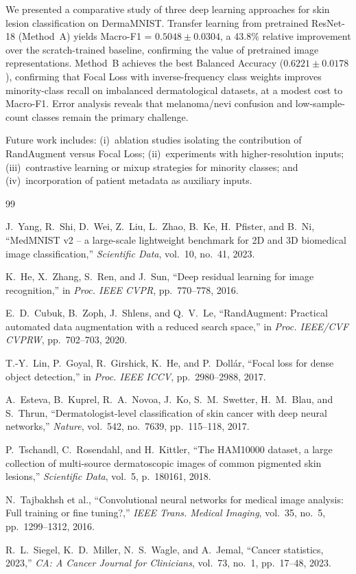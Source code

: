 \documentclass[conference]{IEEEtran}
\begin{document}
We presented a comparative study of three deep learning approaches for
skin lesion classification on DermaMNIST. Transfer learning from
pretrained ResNet-18 (Method~A) yields Macro-F1 = $0.5048 \pm 0.0304$,
a 43.8\% relative improvement over the scratch-trained baseline,
confirming the value of pretrained image representations. Method~B
achieves the best Balanced Accuracy ($0.6221 \pm 0.0178$), confirming
that Focal Loss with inverse-frequency class weights improves
minority-class recall on imbalanced dermatological datasets, at a modest
cost to Macro-F1. Error analysis reveals that melanoma/nevi confusion
and low-sample-count classes remain the primary challenge.

Future work includes: (i)~ablation studies isolating the contribution
of RandAugment versus Focal Loss; (ii)~experiments with higher-resolution
inputs; (iii)~contrastive learning or mixup strategies for minority
classes; and (iv)~incorporation of patient metadata as auxiliary inputs.


\begin{thebibliography}{99}

J.~Yang, R.~Shi, D.~Wei, Z.~Liu, L.~Zhao, B.~Ke, H.~Pfister, and B.~Ni,
``MedMNIST v2 -- a large-scale lightweight benchmark for 2D and 3D biomedical
image classification,''
\emph{Scientific Data}, vol.~10, no.~41, 2023.

K.~He, X.~Zhang, S.~Ren, and J.~Sun,
``Deep residual learning for image recognition,''
in \emph{Proc. IEEE CVPR}, pp.~770--778, 2016.

E.~D.~Cubuk, B.~Zoph, J.~Shlens, and Q.~V.~Le,
``RandAugment: Practical automated data augmentation with a reduced search space,''
in \emph{Proc. IEEE/CVF CVPRW}, pp.~702--703, 2020.

T.-Y.~Lin, P.~Goyal, R.~Girshick, K.~He, and P.~Doll{\'a}r,
``Focal loss for dense object detection,''
in \emph{Proc. IEEE ICCV}, pp.~2980--2988, 2017.

A.~Esteva, B.~Kuprel, R.~A.~Novoa, J.~Ko, S.~M.~Swetter, H.~M.~Blau,
and S.~Thrun,
``Dermatologist-level classification of skin cancer with deep neural networks,''
\emph{Nature}, vol.~542, no.~7639, pp.~115--118, 2017.

P.~Tschandl, C.~Rosendahl, and H.~Kittler,
``The HAM10000 dataset, a large collection of multi-source dermatoscopic images
of common pigmented skin lesions,''
\emph{Scientific Data}, vol.~5, p.~180161, 2018.

N.~Tajbakhsh et al.,
``Convolutional neural networks for medical image analysis: Full training or
fine tuning?,''
\emph{IEEE Trans. Medical Imaging}, vol.~35, no.~5, pp.~1299--1312, 2016.

R.~L.~Siegel, K.~D.~Miller, N.~S.~Wagle, and A.~Jemal,
``Cancer statistics, 2023,''
\emph{CA: A Cancer Journal for Clinicians}, vol.~73, no.~1, pp.~17--48, 2023.

\end{thebibliography}
\end{document}
